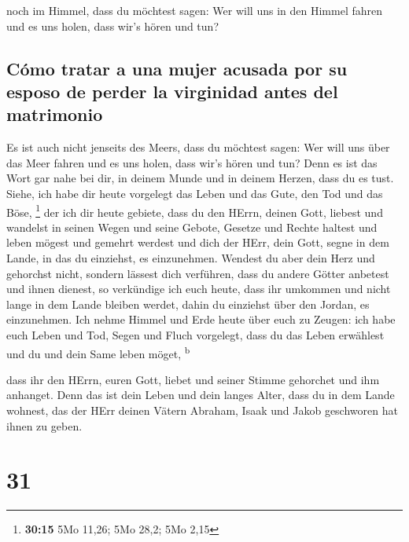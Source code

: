  noch im Himmel, dass du möchtest sagen: Wer will uns in
den Himmel fahren und es uns holen, dass wir's hören und tun?

\hypertarget{cuxf3mo-tratar-a-una-mujer-acusada-por-su-esposo-de-perder-la-virginidad-antes-del-matrimonio}{%
\subsection{Cómo tratar a una mujer acusada por su esposo de perder la
virginidad antes del
matrimonio}\label{cuxf3mo-tratar-a-una-mujer-acusada-por-su-esposo-de-perder-la-virginidad-antes-del-matrimonio}}

 Es ist auch nicht jenseits des Meers, dass du möchtest
sagen: Wer will uns über das Meer fahren und es uns holen, dass wir's
hören und tun?  Denn es ist das Wort gar nahe bei dir, in
deinem Munde und in deinem Herzen, dass du es tust. 
Siehe, ich habe dir heute vorgelegt das Leben und das Gute, den Tod und
das Böse, \footnote{\textbf{30:15} 5Mo 11,26; 5Mo 28,2; 5Mo 2,15}
 der ich dir heute gebiete, dass du den HErrn, deinen
Gott, liebest und wandelst in seinen Wegen und seine Gebote, Gesetze und
Rechte haltest und leben mögest und gemehrt werdest und dich der HErr,
dein Gott, segne in dem Lande, in das du einziehst, es einzunehmen.
 Wendest du aber dein Herz und gehorchst nicht, sondern
lässest dich verführen, dass du andere Götter anbetest und ihnen
dienest,  so verkündige ich euch heute, dass ihr umkommen
und nicht lange in dem Lande bleiben werdet, dahin du einziehst über den
Jordan, es einzunehmen.  Ich nehme Himmel und Erde heute
über euch zu Zeugen: ich habe euch Leben und Tod, Segen und Fluch
vorgelegt, dass du das Leben erwählest und du und dein Same leben möget,
\textsuperscript{b}

 dass ihr den HErrn, euren Gott, liebet und seiner Stimme
gehorchet und ihm anhanget. Denn das ist dein Leben und dein langes
Alter, dass du in dem Lande wohnest, das der HErr deinen Vätern Abraham,
Isaak und Jakob geschworen hat ihnen zu geben.

\hypertarget{section-30}{%
\section{31}\label{section-30}}

